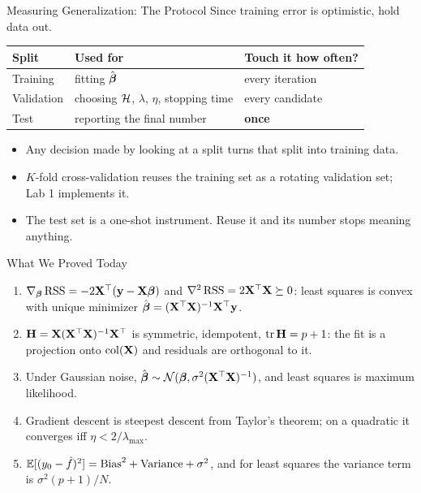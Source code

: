 \documentclass[11pt,aspectratio=169]{beamer}
\begin{document}
\begin{frame}{Measuring Generalization: The Protocol}
Since training error is optimistic, hold data out.
\begin{center}
\begin{tabular}{lll}
\toprule
Split & Used for & Touch it how often? \\
\midrule
Training & fitting $\hat{\boldsymbol{\beta}}$ & every iteration \\
Validation & choosing $\mathcal{H}$, $\lambda$, $\eta$, stopping time & every candidate \\
Test & reporting the final number & \textbf{once} \\
\bottomrule
\end{tabular}
\end{center}
\vspace{6pt}
\begin{itemize}
  \item Any decision made by looking at a split turns that split into training data.
  \item $K$-fold cross-validation reuses the training set as a rotating validation set; Lab 1 implements it.
  \item The test set is a one-shot instrument. Reuse it and its number stops meaning anything.
\end{itemize}
\end{frame}


\begin{frame}{What We Proved Today}
\begin{enumerate}
  \item $\nabla_{\boldsymbol{\beta}}\operatorname{RSS}=-2\mathbf{X}^{\top}(\mathbf{y}-\mathbf{X}\boldsymbol{\beta})$ and $\nabla^2\operatorname{RSS}=2\mathbf{X}^{\top}\mathbf{X}\succeq0$: least squares is convex
        with unique minimizer $\hat{\boldsymbol{\beta}}=(\mathbf{X}^{\top}\mathbf{X})^{-1}\mathbf{X}^{\top}\mathbf{y}$.
  \item $\mathbf{H}=\mathbf{X}(\mathbf{X}^{\top}\mathbf{X})^{-1}\mathbf{X}^{\top}$ is symmetric, idempotent, $\operatorname{tr}\mathbf{H}=p+1$: the fit is a projection onto
        $\operatorname{col}(\mathbf{X})$ and residuals are orthogonal to it.
  \item Under Gaussian noise, $\hat{\boldsymbol{\beta}}\sim\mathcal{N}(\boldsymbol{\beta},\sigma^2(\mathbf{X}^{\top}\mathbf{X})^{-1})$, and least squares is
        maximum likelihood.
  \item Gradient descent is steepest descent from Taylor's theorem; on a quadratic it converges iff $\eta<2/\lambda_{\max}$.
  \item $\mathbb{E}[(y_0-\hat f)^2]=\text{Bias}^2+\text{Variance}+\sigma^2$, and for least squares the variance
        term is $\sigma^2(p+1)/N$.
\end{enumerate}
\end{frame}
\end{document}
